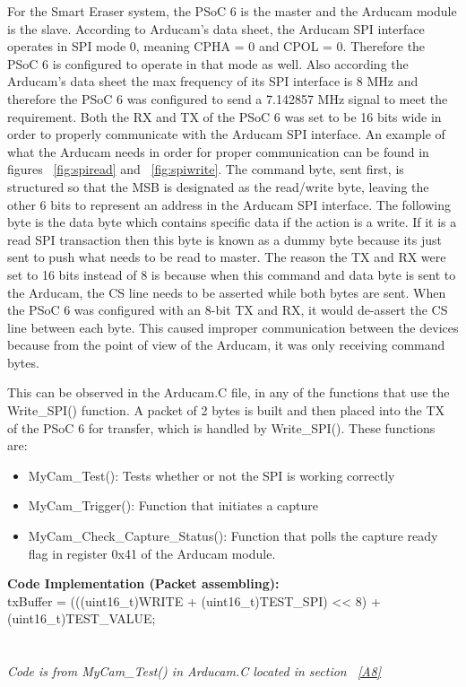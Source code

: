 \setlength{\parindent}{2.5ex} 
For the Smart Eraser system, the PSoC 6 is the master and the Arducam module is the slave. According to Arducam's data sheet, the Arducam SPI interface operates in SPI mode 0, meaning CPHA = 0 and CPOL = 0. Therefore the PSoC 6 is configured to operate in that mode as well. Also according the Arducam's data sheet the max frequency of its SPI interface is 8 MHz and therefore the PSoC 6 was configured to send a 7.142857 MHz signal to meet the requirement. Both the RX and TX of the PSoC 6 was set to be 16 bits wide in order to properly communicate with the Arducam SPI interface. An example of what the Arducam needs in order for proper communication can be found in figures ~\ref{fig:spiread} and  ~\ref{fig:spiwrite}. The command byte, sent first, is structured so that the MSB is designated as the read/write byte, leaving the other 6 bits to represent an address in the Arducam SPI interface. The following byte is the data byte which contains specific data if the action is a write. If it is a read SPI transaction then this byte is known as a dummy byte because its just sent to push what needs to be read to master. The reason the TX and RX were set to 16 bits instead of 8 is because when this command and data byte is sent to the Arducam, the CS line needs to be asserted while both bytes are sent. When the PSoC 6 was configured with an 8-bit TX and RX, it would de-assert the CS line between each byte. This caused improper communication between the devices because from the point of view of the Arducam, it was only receiving command bytes.\par
\setlength{\parindent}{2.5ex}
This can be observed in the Arducam.C file, in any of the functions that use the Write\_SPI() function. A packet of 2 bytes is built and then placed into the TX of the PSoC 6 for transfer, which is handled by Write\_SPI(). These functions are: \\

\begin{itemize}
	\item MyCam\_Test(): Tests whether or not the SPI is working correctly 
	\item MyCam\_Trigger(): Function that initiates a capture 
	\item MyCam\_Check\_Capture\_Status(): Function that polls the capture ready flag in register 0x41 of the Arducam module. \\
\end{itemize}

\noindent \textbf{Code Implementation (Packet assembling):}\\ 
txBuffer = (((uint16\_t)WRITE + (uint16\_t)TEST\_SPI) << 8) + (uint16\_t)TEST\_VALUE;\\
\\\\
\textit{Code is from MyCam\_Test() in Arducam.C located in section ~\ref{A8}}\\\\

